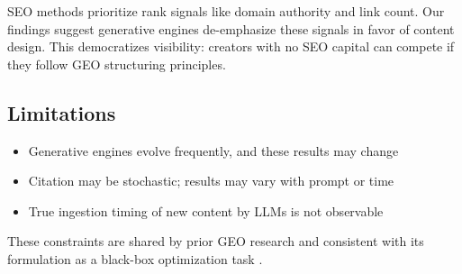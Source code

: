 SEO methods prioritize rank signals like domain authority and link count. Our findings suggest generative engines de-emphasize these signals in favor of content design. This democratizes visibility: creators with no SEO capital can compete if they follow GEO structuring principles.

\subsection{Limitations}

\begin{itemize}
  \item Generative engines evolve frequently, and these results may change
  \item Citation may be stochastic; results may vary with prompt or time
  \item True ingestion timing of new content by LLMs is not observable
\end{itemize}
These constraints are shared by prior GEO research and consistent with its formulation as a black-box optimization task \cite{aggarwal2024geo}.
